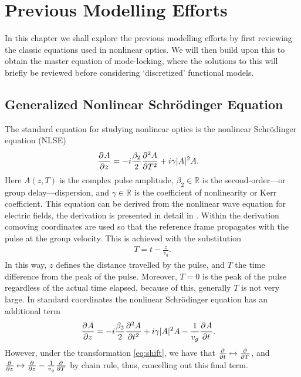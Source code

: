 
\chapter{Previous Modelling Efforts}
In this chapter we shall explore the previous modelling efforts by first reviewing the classic equations used in nonlinear optics. We will then build upon this to obtain the master equation of mode-locking, where the solutions to this will briefly be reviewed before considering `discretized' functional models. \\

\section{Generalized Nonlinear Schr\"odinger Equation}
The standard equation for studying nonlinear optics is the nonlinear Schr\"odinger equation (NLSE) \cite{agrawal2013, anderson, burgoyne2007, desurvire, ferreira, finot, rothenberg}
\begin{align*}
\pdiff{A}{z} &= - i \frac{\beta_2}{2}\pdiff[2]{A}{T} + i \gamma |A|^2 A.
\end{align*}
Here $A(z, T)$ is the complex pulse amplitude, $\beta_2 \in \mathbb{R}$ is the second-order---or group delay---dispersion, and $\gamma \in \mathbb{R}$ is the coefficient of nonlinearity or Kerr coefficient. This equation can be derived from the nonlinear wave equation for electric fields, the derivation is presented in detail in \cite{agrawal2013, ferreira}. Within the derivation comoving coordinates are used so that the reference frame propagates with the pulse at the group velocity. This is achieved with the substitution
\begin{align}
\label{eq:shift}
T = t - \frac{z}{v_g}.
\end{align}
In this way, $z$ defines the distance travelled by the pulse, and $T$ the time difference from the peak of the pulse. Moreover, $T = 0$ is the peak of the pulse regardless of the actual time elapsed, because of this, generally $T$ is not very large. In standard coordinates the nonlinear Schr\"odinger equation has an additional term
\begin{align*}
\pdiff{A}{z} &= - i \frac{\beta_2}{2}\pdiff[2]{A}{t} + i \gamma |A|^2 A - \frac{1}{v_g} \pdiff{A}{t}.
\end{align*}
However, under the transformation \eqref{eq:shift}, we have that $\pdiff{}{t} \mapsto \pdiff{}{T}$, and $\pdiff{}{z} \mapsto \pdiff{}{z} - \frac{1}{v_g} \pdiff{}{T}$ by chain rule, thus, cancelling out this final term. \\

